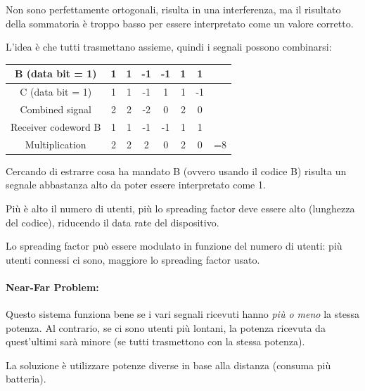Non sono perfettamente ortogonali, risulta in una interferenza, ma il risultato della sommatoria è troppo basso per essere interpretato come un valore corretto.

L'idea è che tutti trasmettano assieme, quindi i segnali possono combinarsi:
\begin{center}
	{
	\renewcommand{\arraystretch}{1.2}
	\begin{tabular}{|c|c|c|c|c|c|c|c|}
		\hline
		B (data bit = 1) & 1 & 1 & -1 & -1 & 1 & 1 &\\ 
		\hline
		C (data bit = 1) & 1 & 1 & -1 & 1 & 1 & -1 &\\ 
		\hline
		Combined signal & 2 & 2 & -2 & 0 & 2 & 0 & \\ 
		\hline
		Receiver codeword B & 1 & 1 & -1 & -1 & 1 & 1 & \\ 
		\hline
		Multiplication & 2 & 2 & 2 & 0 & 2 & 0 & =8 \\ 
		\hline
	\end{tabular}
	}
\end{center}

Cercando di estrarre cosa ha mandato B (ovvero usando il codice B) risulta un segnale abbastanza alto da poter essere interpretato come 1.

Più è alto il numero di utenti, più lo spreading factor deve essere alto (lunghezza del codice), riducendo il data rate del dispositivo. 

Lo spreading factor può essere modulato in funzione del numero di utenti: più utenti connessi ci sono, maggiore lo spreading factor usato.

\paragraph{Near-Far Problem:} Questo sistema funziona bene se i vari segnali ricevuti hanno \textit{più o meno} la stessa potenza. Al contrario, se ci sono utenti più lontani, la potenza ricevuta da quest'ultimi sarà minore (se tutti trasmettono con la stessa potenza).

La soluzione è utilizzare potenze diverse in base alla distanza (consuma più batteria).